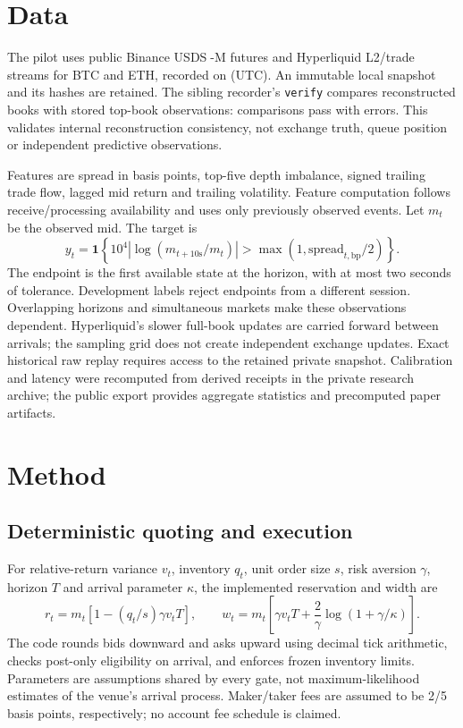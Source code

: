 \documentclass[11pt]{article}
\begin{document}
\section{Data}
The pilot uses public Binance USD\textcircled{\scriptsize S}-M futures and
Hyperliquid L2/trade streams for BTC and ETH, recorded on \DataDate{} (UTC). An
immutable local snapshot and its hashes are retained. The sibling recorder's
\texttt{verify} compares reconstructed books with stored top-book observations:
\BookComparisons{} comparisons pass with \BookErrors{} errors. This validates
internal reconstruction consistency, not exchange truth, queue position or
\BookComparisons{} independent predictive observations.

\begin{table}[htbp]\centering\small

\caption{Development labels and purged chronological split counts. The isotonic
segment is inside the training period; counts need not sum across purged boundaries.}
\label{tab:data}\end{table}

Features are spread in basis points, top-five depth imbalance, signed trailing
trade flow, lagged mid return and trailing volatility. Feature computation follows
receive/processing availability and uses only previously observed events.
Let $m_t$ be the observed mid. The target is
\[
 y_t=\mathbf{1}\left\{10^4\left|\log(m_{t+10\mathrm{s}}/m_t)\right|
                 >\max(1,\mathrm{spread}_{t,\mathrm{bp}}/2)\right\}.
\]
The endpoint is the first available state at the horizon, with at most two seconds
of tolerance. Development labels reject endpoints from a different session.
Overlapping horizons and simultaneous markets make these observations dependent.
Hyperliquid's slower full-book updates are carried forward between arrivals;
the sampling grid does not create independent exchange updates. Exact historical
raw replay requires access to the retained private snapshot. Calibration and
latency were recomputed from derived receipts in the private research archive;
the public export provides aggregate statistics and precomputed paper artifacts.

\section{Method}
\subsection{Deterministic quoting and execution}
For relative-return variance $v_t$, inventory $q_t$, unit order size $s$, risk
aversion $\gamma$, horizon $T$ and arrival parameter $\kappa$, the implemented
reservation and width are
\[
 r_t=m_t[1-(q_t/s)\gamma v_tT],\qquad
 w_t=m_t\left[\gamma v_tT+\frac{2}{\gamma}\log(1+\gamma/\kappa)\right].
\]
The code rounds bids downward and asks upward using decimal tick arithmetic,
checks post-only eligibility on arrival, and enforces frozen inventory limits.
Parameters are assumptions shared by every gate, not maximum-likelihood estimates
of the venue's arrival process. Maker/taker fees are assumed to be 2/5 basis points,
respectively; no account fee schedule is claimed.
\end{document}
